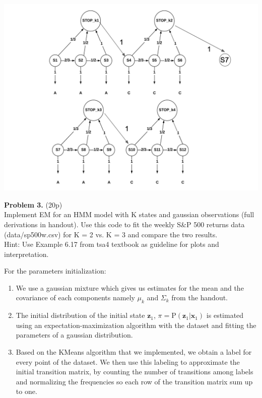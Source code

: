 \documentclass[12pt]{article}
\newcommand{\p}[1]{\mathrm{P}\left(#1 \right)}
\newcommand{\vect}[1]{\mathbf{#1}}
\begin{document}
\begin{center}
	\includegraphics[width=1\linewidth]{figures/problem-2-2.png} 
\end{center}


\noindent \textbf{Problem 3.}  (20p)\\ 
Implement EM for an HMM model with K states and gaussian observations (full derivations in handout). 
Use this code to fit the weekly S\&P 500 returns data (data/sp500w.csv) for K = 2 vs. K = 3 and compare the two results. \\
Hint: Use Example 6.17 from tsa4 textbook as guideline for plots and interpretation.


For the parameters initialization:
\begin{enumerate}
	\item We use a gaussian mixture which gives us estimates for the mean and the covariance of each components namely $\mu_k$ and $\Sigma_k$ from
the handout.
	\item  The initial distribution of the initial state $\vect{z}_1$, $\pi=\p{\vect{z}_1|\vect{x}_1}$ is estimated using an expectation-maximization algorithm with the dataset and fitting the parameters of a gaussian distribution.
	\item Based on the KMeans algorithm that we implemented, we obtain a label for every point of the dataset. We then use this labeling to approximate the initial transition matrix, by counting the number of transitions among labels 
and normalizing the frequencies so each row of the transition matrix sum up to one.
\end{enumerate}
\end{document}
